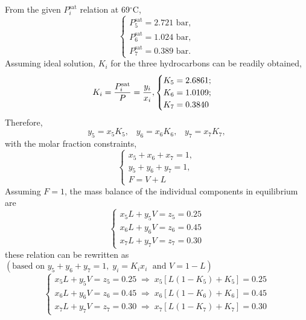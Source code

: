 \begin{enumerate}[1)]
From the given $P_{i}^{\text{sat}}$ relation at 69$^{\circ}$C,
   \begin{displaymath}
        \begin{cases}
            P_{5}^{\text{sat}} = 2.721 \text{ bar},\\ 
            P_{6}^{\text{sat}} = 1.024 \text{ bar},\\
            P_{7}^{\text{sat}} = 0.389 \text{ bar}.
        \end{cases}
   \end{displaymath}
Assuming ideal solution, $K_{i}$ for the three hydrocarbons can be readily obtained,
   \begin{displaymath}
        K_{i} = \displaystyle\frac{P_{i}^{\text{sat}}}{P} = \displaystyle\frac{y_{i}}{x_{i}},
          \begin{cases}
             K_{5} = 2.6861; \\
             K_{6} = 1.0109; \\
             K_{7} = 0.3840
          \end{cases}
   \end{displaymath}
   Therefore,
   \begin{displaymath}
       y_{5} = x_{5}K_{5},\;\;\;y_{6} = x_{6}K_{6},\;\;\;y_{7} = x_{7}K_{7},
   \end{displaymath}
    with the molar fraction constraints,
    \begin{displaymath}
        \begin{cases}
            x_{5}+x_{6}+x_{7} = 1,\\ 
            y_{5}+y_{6}+y_{7} = 1, \\
            F = V + L
        \end{cases}
   \end{displaymath}
   Assuming $F=1$, the mass balance of the individual components in equilibrium are
    \begin{displaymath}
        \begin{cases}
            x_{5}L + y_{5}V = z_{5} = 0.25 \\
            x_{6}L + y_{6}V = z_{6} = 0.45 \\
            x_{7}L + y_{7}V = z_{7} = 0.30            
        \end{cases}
   \end{displaymath}
   these relation can be rewritten as $\left(\text{based on }y_{5}+y_{6}+y_{7} = 1,\; y_{i}=K_{i}x_{i} \;\text{ and } V= 1-L\right)$
    \begin{displaymath}
        \begin{cases}
            x_{5}L + y_{5}V = z_{5} = 0.25 \;\Longrightarrow\; x_{5}\left[L\left(1-K_{5}\right)+K_{5}\right] = 0.25 \\
            x_{6}L + y_{6}V = z_{6} = 0.45 \;\Longrightarrow\; x_{6}\left[L\left(1-K_{6}\right)+K_{6}\right] = 0.45 \\
            x_{7}L + y_{7}V = z_{7} = 0.30 \;\Longrightarrow\; x_{7}\left[L\left(1-K_{7}\right)+K_{7}\right] = 0.30
        \end{cases}
   \end{displaymath}



\end{enumerate}
